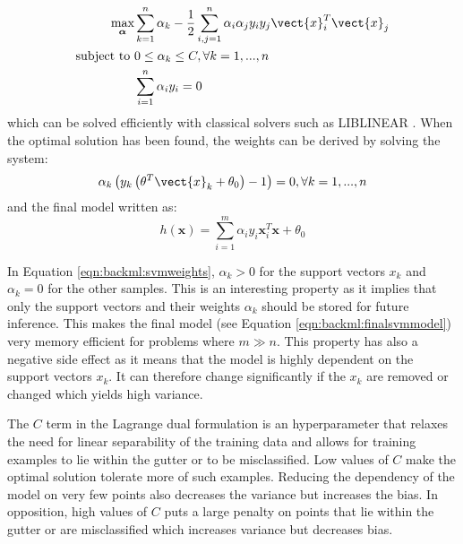 \begin{align}
\label{eqn:backml:svmoptimizationproblem}
\underset{\boldsymbol{\alpha}}{\text{max}}& \sum_{k=1}^n \alpha_k - \frac{1}{2} \sum_{i,j=1}^n \alpha_i\alpha_j y_i y_j \vect{x}_i^T \vect{x}_j \\
\text{subject to}~& 0 \leq \alpha_k \leq C, \forall k = 1, ..., n \\
& \sum_{i=1}^n \alpha_i y_i = 0
\end{align}
which can be solved efficiently with classical solvers such as LIBLINEAR
\cite{fan2008liblinear}. When the optimal solution has been found, the weights
can be derived by solving the system:
\begin{equation}
\label{eqn:backml:svmweights}
\alpha_k\left(y_k \left(\theta^T \vect{x}_k + \theta_0 \right) - 1\right) = 0, \forall k = 1, ..., n
\end{equation}
and the final model written as:
\begin{equation}
  h(\mathbf{x}) = \sum_{i=1}^m \alpha_i y_i \mathbf{x}_i^T\mathbf{x} + \theta_0
  \label{eqn:backml:finalsvmmodel}
\end{equation}

In Equation \ref{eqn:backml:svmweights}, $\alpha_k > 0$ for the support vectors
$x_k$ and $\alpha_k = 0$ for the other samples. This is an interesting property
as it implies that only the support vectors and their weights $\alpha_k$ should
be stored for future inference. This makes the final model (see Equation \ref{eqn:backml:finalsvmmodel}) 
very memory efficient for
problems where $m \gg n$. This property has also a negative side effect as it
means that the model is highly dependent on the support vectors $x_k$. It can
therefore change significantly if the $x_k$ are removed or changed which yields
high variance.

The $C$ term in the Lagrange dual formulation is an hyperparameter that relaxes
the need for linear separability of the training data and allows for training
examples to lie within the gutter or to be misclassified. Low values of $C$ make
the optimal solution tolerate more of such examples. Reducing the dependency of
the model on very few points also decreases the variance but increases the bias.
In opposition, high values of $C$ puts a large penalty on points that lie within
the gutter or are misclassified which increases variance but decreases bias.

